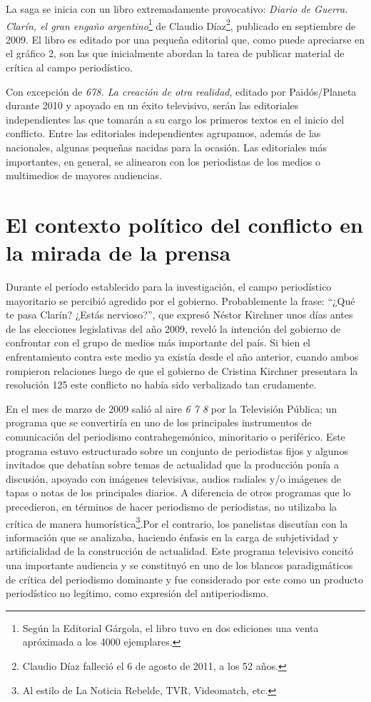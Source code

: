 La saga se inicia con un libro extremadamente provocativo: \emph{Diario de Guerra. Clarín, el gran engaño argentino}\footnote{Según la Editorial Gárgola, el libro tuvo en dos ediciones una venta apróximada a los \num{4000} ejemplares.} de Claudio Díaz\footnote{Claudio Díaz falleció el 6 de agosto de 2011, a los 52 años.}, publicado en septiembre de 2009. El libro es editado por una pequeña editorial que, como puede apreciarse en el gráfico 2, son las que inicialmente abordan la tarea de publicar material de crítica al campo periodístico.

Con excepción de \emph{678. La creación de otra realidad}, editado por Paidós/Planeta durante 2010 y apoyado en un éxito televisivo, serán las editoriales independientes las que tomarán a su cargo los primeros textos en el inicio del conflicto. Entre las editoriales independientes agrupamos, además de las nacionales, algunas pequeñas nacidas para la ocasión. Las editoriales más importantes, en general, se alinearon con los periodistas de los medios o multimedios de mayores audiencias.

\section {El contexto político del conflicto en la mirada de la prensa}

Durante el período establecido para la investigación, el campo periodístico mayoritario se percibió agredido por el gobierno. Probablemente la frase: ``¿Qué te pasa Clarín? ¿Estás nervioso?'', que expresó Néstor Kirchner unos días antes de las elecciones legislativas del año 2009, reveló la intención del gobierno de confrontar con el grupo de medios más importante del país. Si bien el enfrentamiento contra este medio ya existía desde el año anterior, cuando ambos rompieron relaciones luego de que el gobierno de Cristina Kirchner presentara la resolución 125  este conflicto no había sido verbalizado tan crudamente.

En el mes de marzo de 2009 salió al aire \emph{6 7 8 }por la Televisión Pública; un programa que se convertiría en uno de los principales instrumentos de comunicación del periodismo contrahegemónico, minoritario o periférico. Este programa estuvo estructurado sobre un conjunto de periodistas fijos y algunos invitados que debatían sobre temas de actualidad que la producción ponía a discusión, apoyado con imágenes televisivas, audios radiales y/o imágenes de tapas o notas de los principales diarios. A diferencia de otros programas que lo precedieron, en términos de hacer periodismo de periodistas, no utilizaba la crítica de manera humorística\footnote{Al estilo de La Noticia Rebelde, TVR, Videomatch, etc.}.Por el contrario, los panelistas discutían con la información que se analizaba, haciendo énfasis en la carga de subjetividad y artificialidad de la construcción de actualidad. Este programa televisivo concitó una importante audiencia y se constituyó en uno de los blancos paradigmáticos de crítica del periodismo dominante y fue considerado por este como un producto periodístico no legítimo, como expresión del antiperiodismo.

